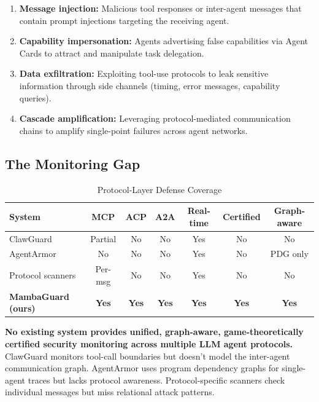 \documentclass[12pt,a4paper]{article}
\begin{document}
\begin{enumerate}
    \item \textbf{Message injection:} Malicious tool responses or inter-agent messages that contain prompt injections targeting the receiving agent.
    
    \item \textbf{Capability impersonation:} Agents advertising false capabilities via Agent Cards to attract and manipulate task delegation.
    
    \item \textbf{Data exfiltration:} Exploiting tool-use protocols to leak sensitive information through side channels (timing, error messages, capability queries).
    
    \item \textbf{Cascade amplification:} Leveraging protocol-mediated communication chains to amplify single-point failures across agent networks.
\end{enumerate}

\subsection{The Monitoring Gap}

\begin{table}[H]
\centering
\caption{Protocol-Layer Defense Coverage}
\begin{tabularx}{\textwidth}{@{}lcccccc@{}}
\toprule
\textbf{System} & \textbf{MCP} & \textbf{ACP} & \textbf{A2A} & \textbf{Real-time} & \textbf{Certified} & \textbf{Graph-aware} \\
\midrule
ClawGuard & Partial & No & No & Yes & No & No \\
AgentArmor & No & No & No & Yes & No & PDG only \\
Protocol scanners & Per-msg & No & No & Yes & No & No \\
\textbf{MambaGuard (ours)} & \textbf{Yes} & \textbf{Yes} & \textbf{Yes} & \textbf{Yes} & \textbf{Yes} & \textbf{Yes} \\
\bottomrule
\end{tabularx}
\end{table}

\textbf{No existing system provides unified, graph-aware, game-theoretically certified security monitoring across multiple LLM agent protocols.} ClawGuard monitors tool-call boundaries but doesn't model the inter-agent communication graph. AgentArmor uses program dependency graphs for single-agent traces but lacks protocol awareness. Protocol-specific scanners check individual messages but miss relational attack patterns.
\end{document}
